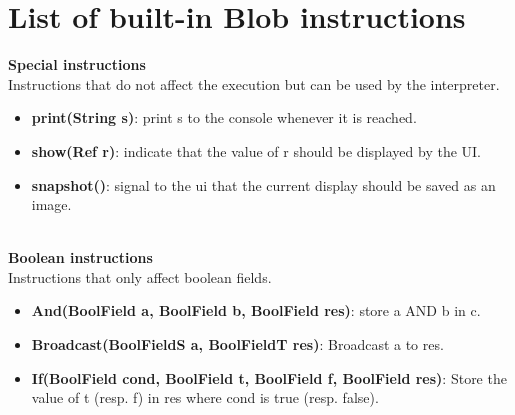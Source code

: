 \documentclass[11pt,a4paper]{report}
\begin{document}
\section{List of built-in Blob instructions}

\textbf{Special instructions}\\
Instructions that do not affect the execution but can be used by the interpreter.
\begin{itemize}
	\item \textbf{print(String s)}: print s to the console whenever it is reached.
	\item \textbf{show(Ref r)}: indicate that the value of r should be displayed by the UI.
	\item \textbf{snapshot()}: signal to the ui that the current display should be saved as an image.
\end{itemize}$ $\\

\textbf{Boolean instructions}\\
Instructions that only affect boolean fields.
\begin{itemize}
	\item \textbf{And(BoolField a, BoolField b, BoolField res)}: store a AND b in c.
	\item \textbf{Broadcast(BoolFieldS a, BoolFieldT res)}: Broadcast a to res.
	\item \textbf{If(BoolField cond, BoolField t, BoolField f, BoolField res)}: Store the value of t (resp. f) in res where cond is true (resp. false). 
\end{itemize}$ $\\
\end{document}
